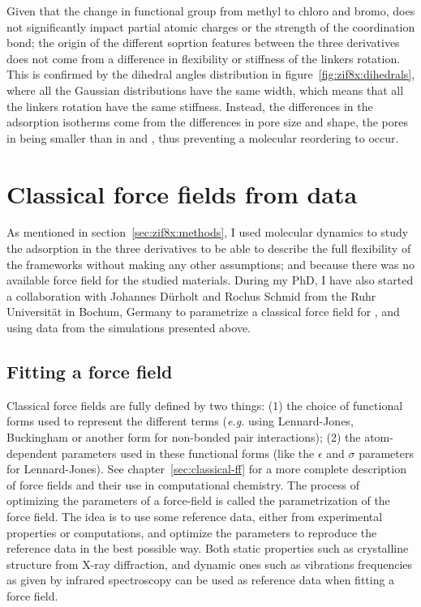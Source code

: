 \documentclass[thesis]{subfiles}
\begin{document}
Given that the change in functional group from methyl to chloro and bromo, does
not significantly impact partial atomic charges or the strength of the 
coordination bond; the origin of the different soprtion features between the
three  derivatives does not come from a difference in flexibility or
stiffness of the linkers rotation. This is confirmed by the dihedral angles
distribution in figure~\ref{fig:zif8x:dihedrals}, where all the Gaussian
distributions have the same width, which means that all the linkers rotation
have the same stiffness. Instead, the differences in the adsorption isotherms
come from the differences in pore size and shape, the pores in \ZIFBr being
smaller than in \ZIFCl and , thus preventing a molecular reordering to
occur.

\section{Classical force fields from \abinitio data}
\label{sec:classical-ff-parametrize}

As mentioned in section~\ref{sec:zif8x:methods}, I used \abinitio molecular
dynamics to study the adsorption in the three  derivatives to be able to
describe the full flexibility of the frameworks without making any other
assumptions; and because there was no available force field for the studied
materials. During my PhD, I have also started a collaboration with Johannes
Dürholt and Rochus Schmid from the Ruhr Universität in Bochum, Germany to
parametrize a classical force field for , \ZIFCl and \ZIFBr using data
from the \abinitio simulations presented above.

\subsection{Fitting a force field}

Classical force fields are fully defined by two things: (1) the choice of
functional forms used to represent the different terms (\emph{e.g.} using
Lennard-Jones, Buckingham or another form for non-bonded pair interactions); (2)
the atom-dependent parameters used in these functional forms (like the
$\epsilon$ and $\sigma$ parameters for Lennard-Jones). See
chapter~\ref{sec:classical-ff} for a more complete description of force fields
and their use in computational chemistry.  The process of optimizing the
parameters of a force-field is called the parametrization of the force field.
The idea is to use some reference data, either from experimental properties or
\abinitio computations, and optimize the parameters to reproduce the reference
data in the best possible way. Both static properties such as crystalline
structure from X-ray diffraction, and dynamic ones such as vibrations
frequencies as given by infrared spectroscopy can be used as reference data when
fitting a force field.
\end{document}
